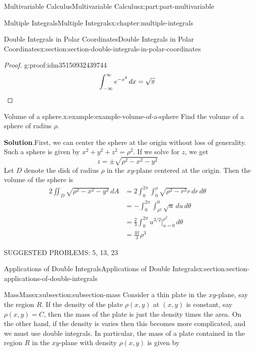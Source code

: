 \documentclass[twoside,10pt,]{tufte-book}
\newcommand{\blocktitlefont}{\relax}
\numberwithin{equation}{part}
\newcommand{\qedhere}{\relax}
\begin{document}
\begin{partptx}{Multivariable Calculus}{}{Multivariable Calculus}{}{}{x:part:part-multivariable}
\begin{chapterptx}{Multiple Integrals}{}{Multiple Integrals}{}{}{x:chapter:multiple-integrals}
\begin{sectionptx}{Double Integrals in Polar Coordinates}{}{Double Integrals in Polar Coordinates}{}{}{x:section:section-double-integrals-in-polar-coordinates}
\begin{proof}{}{g:proof:idm35150932439744}
\begin{equation*}
\int_{-\infty}^{\infty}e^{-x^{2}}\,dx = \sqrt{\pi}\qedhere
\end{equation*}
%
\end{proof}
\begin{example}{Volume of a sphere.}{x:example:example-volume-of-a-sphere}%
Find the volume of a sphere of radius \(\rho\).%
\par\smallskip%
\noindent\textbf{\blocktitlefont Solution}.\hypertarget{g:solution:idm35150932385728}{}\quad{}First, we can center the sphere at the origin without loss of generality. Such a sphere is given by \(x^{2} + y^{2} + z^{2} = \rho^{2}\). If we solve for \(z\), we get%
\begin{equation*}
z = \pm\sqrt{\rho^{2} - x^{2} - y^{2}}
\end{equation*}
Let \(D\) denote the disk of radius \(\rho\) in the \(xy\)-plane centered at the origin. Then the volume of the sphere is%
\begin{align*}
2\iint_{D}\sqrt{\rho^{2} - x^{2} - y^{2}}\,dA & = 2\int_{0}^{2\pi}\int_{0}^{\rho}\sqrt{\rho^{2} - r^{2}}r\,dr\,d\theta \\
& = -\int_{0}^{2\pi}\int_{\rho^{2}}^{0}\sqrt{u}\,du\,d\theta \\
& = \frac{2}{3}\int_{0}^{2\pi}u^{3/2}\bigg]_{u=0}^{\rho^{2}}\,d\theta \\
& = \frac{4\pi}{3}\rho^{3} 
\end{align*}
%
\end{example}
SUGGESTED PROBLEMS: 5, 13, 23%
\end{sectionptx}
%
%
\typeout{************************************************}
\typeout{************************************************}
%
\begin{sectionptx}{Applications of Double Integrals}{}{Applications of Double Integrals}{}{}{x:section:section-applications-of-double-integrals}
%
%
\typeout{************************************************}
\typeout{************************************************}
%
\begin{subsectionptx}{Mass}{}{Mass}{}{}{x:subsection:subsection-mass}
Consider a thin plate in the \(xy\)-plane, say the region \(R\). If the density of the plate \(\rho(x,y)\) at \((x,y)\) is constant, say \(\rho(x,y) = C\), then the mass of the plate is just the density times the area. On the other hand, if the density is varies then this becomes more complicated, and we must use double integrals. In particular, the mass of a plate contained in the region \(R\) in the \(xy\)-plane with density \(\rho(x,y)\) is given by%

\end{subsectionptx}
\end{sectionptx}
\end{chapterptx}
\end{partptx}
\end{document}
